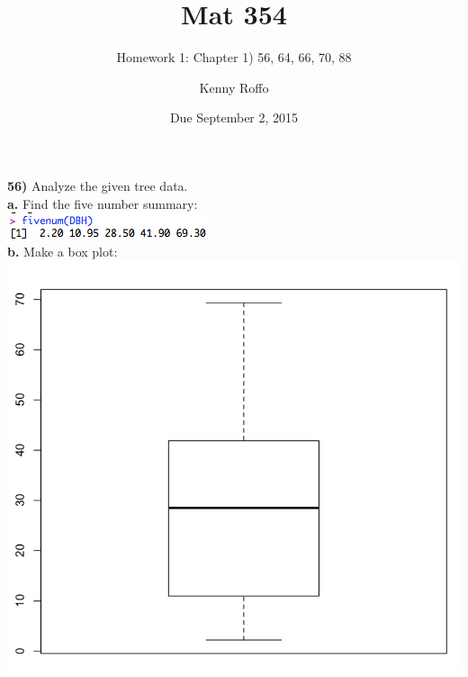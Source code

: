 \documentclass{scrartcl}
\title{Mat 354}
\subtitle{Homework 1: Chapter 1) 56, 64, 66, 70, 88}
\author{Kenny Roffo}
\date{Due September 2, 2015}
\begin{document}
\maketitle
\textbf{56)} Analyze the given tree data.\\

\textbf{a.} Find the five number summary:\\
\includegraphics[keepaspectratio=true, scale=0.75]{ch1_56_fivenum.png}\\

\textbf{b.} Make a box plot:\\
\includegraphics[keepaspectratio=true, scale=0.2]{ch1_56_boxplot.png}\\
\end{document}
